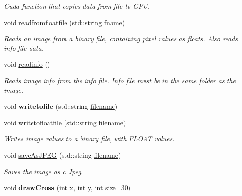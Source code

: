 \begin{DoxyCompactItemize}
\begin{DoxyCompactList}\small\item\em Cuda function that copies data from file to G\+PU. \end{DoxyCompactList}\item 
void \hyperlink{classImage__cuda__compatible_ac96a12fbf9cf640638e59d370d0ca6d8}{readfromfloatfile} (std\+::string fname)
\begin{DoxyCompactList}\small\item\em Reads an image from a binary file, containing pixel values as floats. Also reads info file data. \end{DoxyCompactList}\item 
void \hyperlink{classImage__cuda__compatible_a92324b2016515f6eb3996a84017eba4a}{readinfo} ()
\begin{DoxyCompactList}\small\item\em Reads image info from the info file. Info file must be in the same folder as the image. \end{DoxyCompactList}\item 
void {\bfseries writetofile} (std\+::string \hyperlink{classImage__cuda__compatible_a5dbc3fe00b4ca74f9a3868849cb24406}{filename})\hypertarget{classImage__cuda__compatible_af2d4cbc263cfcb4fc09b5a51b7512c9c}{}\label{classImage__cuda__compatible_af2d4cbc263cfcb4fc09b5a51b7512c9c}

\item 
void \hyperlink{classImage__cuda__compatible_a0703a45b3aae00a554fe07d76b85620d}{writetofloatfile} (std\+::string \hyperlink{classImage__cuda__compatible_a5dbc3fe00b4ca74f9a3868849cb24406}{filename})\hypertarget{classImage__cuda__compatible_a0703a45b3aae00a554fe07d76b85620d}{}\label{classImage__cuda__compatible_a0703a45b3aae00a554fe07d76b85620d}

\begin{DoxyCompactList}\small\item\em Writes image values to a binary file, with F\+L\+O\+AT values. \end{DoxyCompactList}\item 
void \hyperlink{classImage__cuda__compatible_a744b4e852b257cf82ae869871bfc90bd}{save\+As\+J\+P\+EG} (std\+::string \hyperlink{classImage__cuda__compatible_a5dbc3fe00b4ca74f9a3868849cb24406}{filename})
\begin{DoxyCompactList}\small\item\em Saves the image as a Jpeg. \end{DoxyCompactList}\item 
void {\bfseries draw\+Cross} (int x, int y, int \hyperlink{classImage__cuda__compatible_a22cea4d1e5568cbea748f48901d99529}{size}=30)\hypertarget{classImage__cuda__compatible_a2f1d26cc2a5fa5d978aff025568fcea2}{}\label{classImage__cuda__compatible_a2f1d26cc2a5fa5d978aff025568fcea2}


\end{DoxyCompactItemize}
